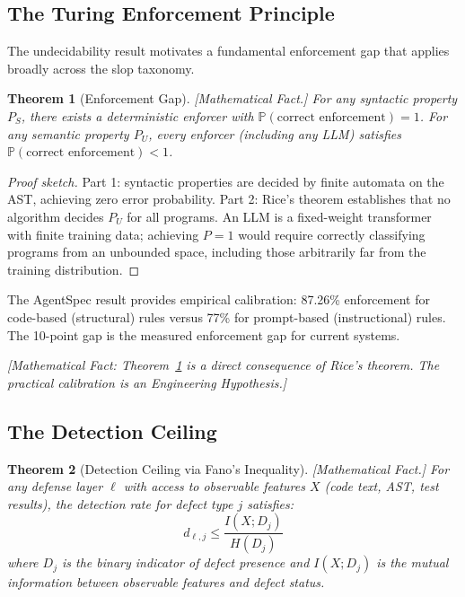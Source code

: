\documentclass[11pt, a4paper, logo, copyright]{googledeepmind}
\newtheorem{theorem}{Theorem}[section]
\newcommand{\Prob}{\mathbb{P}}
\begin{document}
\subsection{The Turing Enforcement Principle}

The undecidability result motivates a fundamental enforcement gap that applies broadly across the slop taxonomy.

\begin{theorem}[Enforcement Gap]
\label{thm:enforcement-gap}
\emph{[Mathematical Fact.]} For any syntactic property $P_S$, there exists a deterministic enforcer with $\Prob(\text{correct enforcement}) = 1$. For any semantic property $P_U$, every enforcer (including any LLM) satisfies $\Prob(\text{correct enforcement}) < 1$.
\end{theorem}

\begin{proof}[Proof sketch]
Part 1: syntactic properties are decided by finite automata on the AST, achieving zero error probability. Part 2: Rice's theorem establishes that no algorithm decides $P_U$ for all programs. An LLM is a fixed-weight transformer with finite training data; achieving $P = 1$ would require correctly classifying programs from an unbounded space, including those arbitrarily far from the training distribution.
\end{proof}

The AgentSpec result \citep{wang2026agentspec} provides empirical calibration: 87.26\% enforcement for code-based (structural) rules versus 77\% for prompt-based (instructional) rules. The 10-point gap is the measured enforcement gap for current systems.

\emph{[Mathematical Fact: Theorem~\ref{thm:enforcement-gap} is a direct consequence of Rice's theorem. The practical calibration is an Engineering Hypothesis.]}

\subsection{The Detection Ceiling}

\begin{theorem}[Detection Ceiling via Fano's Inequality]
\label{thm:detection-ceiling}
\emph{[Mathematical Fact.]} For any defense layer $\ell$ with access to observable features $X$ (code text, AST, test results), the detection rate for defect type $j$ satisfies:
\begin{equation}
    d_{\ell,j} \leq \frac{I(X; D_j)}{H(D_j)}
\end{equation}
where $D_j$ is the binary indicator of defect presence and $I(X; D_j)$ is the mutual information between observable features and defect status.
\end{theorem}
\end{document}

